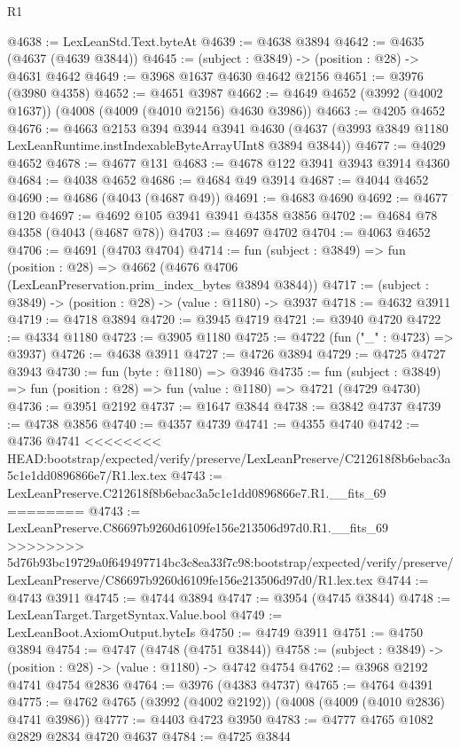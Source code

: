 \begin{lexlean}{R1}
\begin{coremodule}
{{{{{{{{{{{{{{{{{{{{{{{{{{{{{{{{{{{{{{{{{{{{{{{{{{{{{{{{{{{{{{{{{{{{{{{{{{{{{{{{{{{{{{{{{{{{{{{{{{{{{{{{{{{{{{{{{{{{{{{{{{{{{{{{{{{{{{{{{{{{{{{{{{{{{{{{{{{{{{{{{{{{{{{{{{{{{{{{{{{{{{{{{{@4638 := LexLeanStd.Text.byteAt
@4639 := @4638 @3894
@4642 := @4635 (@4637 (@4639 @3844))
@4645 := (subject : @3849) -> (position : @28) -> @4631 @4642
@4649 := @3968 @1637 @4630 @4642 @2156
@4651 := @3976 (@3980 @4358)
@4652 := @4651 @3987
@4662 := @4649 @4652 (@3992 (@4002 @1637)) (@4008 (@4009 (@4010 @2156) @4630 @3986))
@4663 := @4205 @4652
@4676 := @4663
    @2153
    @394
    @3944
    @3941
    @4630
    (@4637 (@3993 @3849 @1180 LexLeanRuntime.instIndexableByteArrayUInt8 @3894 @3844))
@4677 := @4029 @4652
@4678 := @4677 @131
@4683 := @4678 @122 @3941 @3943 @3914 @4360
@4684 := @4038 @4652
@4686 := @4684 @49 @3914
@4687 := @4044 @4652
@4690 := @4686 (@4043 (@4687 @49))
@4691 := @4683 @4690
@4692 := @4677 @120
@4697 := @4692 @105 @3941 @3941 @4358 @3856
@4702 := @4684 @78 @4358 (@4043 (@4687 @78))
@4703 := @4697 @4702
@4704 := @4063 @4652
@4706 := @4691 (@4703 @4704)
@4714 := fun (subject : @3849) =>
  fun (position : @28) => @4662 (@4676 @4706 (LexLeanPreservation.prim_index_bytes @3894 @3844))
@4717 := (subject : @3849) -> (position : @28) -> (value : @1180) -> @3937
@4718 := @4632 @3911
@4719 := @4718 @3894
@4720 := @3945 @4719
@4721 := @3940 @4720
@4722 := @4334 @1180
@4723 := @3905 @1180
@4725 := @4722 (fun ("_" : @4723) => @3937)
@4726 := @4638 @3911
@4727 := @4726 @3894
@4729 := @4725 @4727 @3943
@4730 := fun (byte : @1180) => @3946
@4735 := fun (subject : @3849) => fun (position : @28) => fun (value : @1180) => @4721 (@4729 @4730)
@4736 := @3951 @2192
@4737 := @1647 @3844
@4738 := @3842 @4737
@4739 := @4738 @3856
@4740 := @4357 @4739
@4741 := @4355 @4740
@4742 := @4736 @4741
<<<<<<<< HEAD:bootstrap/expected/verify/preserve/LexLeanPreserve/C212618f8b6ebac3a5c1e1dd0896866e7/R1.lex.tex
@4743 := LexLeanPreserve.C212618f8b6ebac3a5c1e1dd0896866e7.R1.__fits_69
========
@4743 := LexLeanPreserve.C86697b9260d6109fe156e213506d97d0.R1.__fits_69
>>>>>>>> 5d76b93bc19729a0f649497714bc3c8ea33f7c98:bootstrap/expected/verify/preserve/LexLeanPreserve/C86697b9260d6109fe156e213506d97d0/R1.lex.tex
@4744 := @4743 @3911
@4745 := @4744 @3894
@4747 := @3954 (@4745 @3844)
@4748 := LexLeanTarget.TargetSyntax.Value.bool
@4749 := LexLeanBoot.AxiomOutput.byteIs
@4750 := @4749 @3911
@4751 := @4750 @3894
@4754 := @4747 (@4748 (@4751 @3844))
@4758 := (subject : @3849) -> (position : @28) -> (value : @1180) -> @4742 @4754
@4762 := @3968 @2192 @4741 @4754 @2836
@4764 := @3976 (@4383 @4737)
@4765 := @4764 @4391
@4775 := @4762 @4765 (@3992 (@4002 @2192)) (@4008 (@4009 (@4010 @2836) @4741 @3986))
@4777 := @4403 @4723 @3950
@4783 := @4777 @4765 @1082 @2829 @2834 @4720 @4637
@4784 := @4725 @3844
}}}}}}}}}}}}}}}}}}}}}}}}}}}}}}}}}}}}}}}}}}}}}}}}}}}}}}}}}}}}}}}}}}}}}}}}}}}}}}}}}}}}}}}}}}}}}}}}}}}}}}}}}}}}}}}}}}}}}}}}}}}}}}}}}}}}}}}}}}}}}}}}}}}}}}}}}}}}}}}}}}}}}}}}}}}}}}}}}}}}}}}}}}
\end{coremodule}
\end{lexlean}
